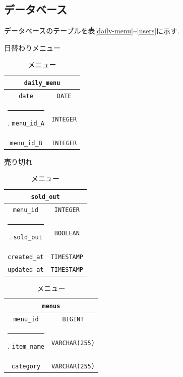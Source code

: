 \documentclass[a4paper]{ltjsarticle}
\makeatletter
\def\Hline{
    \noalign{\ifnum0=`}\fi\hrule \@height 3.\arrayrulewidth \futurelet
    \reserved@a\@xhline}
\makeatother
\begin{document}
    \subsection{データベース}
        データベースのテーブルを表\ref{daily-menu}\sim\ref{users}に示す.
        \begin{table}[h]
            \begin{minipage}[t]{.49\textwidth}
                \center
                \caption{日替わりメニュー}
                \label{daily-menu}
                \begin{tabular}{|c|c|}
                    \hline
                    \multicolumn{2}{|c|}{\texttt{daily\_menu}} \\ \hline \hline
                    \verb|date| & \verb|DATE| \\ \Hline
                    \verb|menu_id_A| & \verb|INTEGER| \\ \hline
                    \verb|menu_id_B| & \verb|INTEGER| \\ \hline
                \end{tabular}
                \center
                \caption{売り切れ}
                \label{soldout}
                \begin{tabular}{|c|c|}
                    \hline
                    \multicolumn{2}{|c|}{\texttt{sold\_out}} \\ \hline \hline
                    \verb|menu_id| & \verb|INTEGER| \\ \Hline
                    \verb|sold_out| & \verb|BOOLEAN| \\ \hline
                    \verb|created_at| & \verb|TIMESTAMP| \\ \hline
                    \verb|updated_at| & \verb|TIMESTAMP| \\ \hline
                \end{tabular}
            \end{minipage}
            \begin{minipage}[t]{.49\textwidth}
                \center
                \caption{メニュー}
                \label{menu}
                \begin{tabular}{|c|c|}
                    \hline
                    \multicolumn{2}{|c|}{\texttt{menus}} \\ \hline \hline
                    \verb|menu_id| & \verb|BIGINT| \\ \Hline
                    \verb|item_name| & \verb|VARCHAR(255)| \\ \hline
                    \verb|category| & \verb|VARCHAR(255)| \\ \hline

\end{tabular}
\end{minipage}
\end{table}
\end{document}
